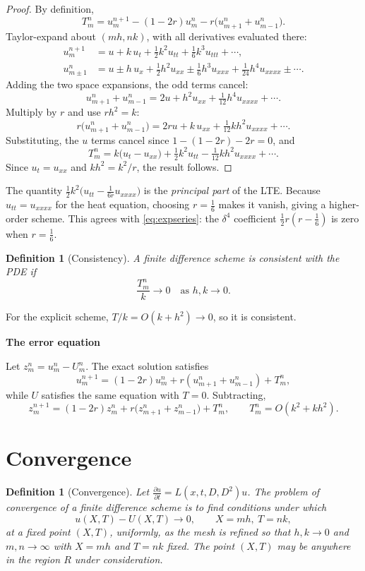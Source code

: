 \documentclass[11pt,a4paper]{article}
\numberwithin{equation}{section}
\theoremstyle{spacedplain}
\theoremstyle{spaceddefinition}
\newtheorem{definition}[theorem]{Definition}
\theoremstyle{spacedremark}
\newcommand{\step}[1]{\par\addvspace{0.6em}\noindent\textbf{#1}\par\nobreak}
\newcommand{\pd}[2]{\frac{\partial #1}{\partial #2}}
\begin{document}
\begin{proof}
By definition,
\[
  T_m^n=u_m^{n+1}-(1-2r)u_m^n-r\bigl(u_{m+1}^n+u_{m-1}^n\bigr).
\]
Taylor-expand about \((mh,nk)\), with all derivatives evaluated there:
\begin{align*}
  u_m^{n+1}&=u+k\,u_t+\tfrac12k^2u_{tt}+\tfrac16k^3u_{ttt}+\cdots,\\
  u_{m\pm1}^n&=u\pm h\,u_x+\tfrac12h^2u_{xx}\pm\tfrac16h^3u_{xxx}
    +\tfrac1{24}h^4u_{xxxx}\pm\cdots.
\end{align*}
Adding the two space expansions, the odd terms cancel:
\[
  u_{m+1}^n+u_{m-1}^n=2u+h^2u_{xx}+\tfrac1{12}h^4u_{xxxx}+\cdots.
\]
Multiply by \(r\) and use \(rh^2=k\):
\[
  r\bigl(u_{m+1}^n+u_{m-1}^n\bigr)
  =2ru+k\,u_{xx}+\tfrac{1}{12}kh^2u_{xxxx}+\cdots.
\]
Substituting, the \(u\) terms cancel since \(1-(1-2r)-2r=0\), and
\[
  T_m^n=k\bigl(u_t-u_{xx}\bigr)+\tfrac12k^2u_{tt}
        -\tfrac1{12}kh^2u_{xxxx}+\cdots.
\]
Since \(u_t=u_{xx}\) and \(kh^2=k^2/r\), the result follows.
\end{proof}

The quantity
\(\frac12k^2\bigl(u_{tt}-\frac1{6r}u_{xxxx}\bigr)\) is the
\emph{principal part} of the LTE.  Because \(u_{tt}=u_{xxxx}\) for the
heat equation, choosing \(r=\frac16\) makes it vanish, giving a
higher-order scheme.  This agrees with \eqref{eq:expseries}: the
\(\delta^4\) coefficient \(\frac12r(r-\frac16)\) is zero when
\(r=\frac16\).

\begin{definition}[Consistency]
A finite difference scheme is \emph{consistent} with the PDE if
\[
  \frac{T_m^n}{k}\to0\quad\text{as }h,k\to0.
\]
\end{definition}

For the explicit scheme, \(T/k=O(k+h^2)\to0\), so it is consistent.

\step{The error equation}
Let \(z_m^n=u_m^n-U_m^n\).  The exact
solution satisfies
\[
  u_m^{n+1}=(1-2r)u_m^n+r(u_{m+1}^n+u_{m-1}^n)+T_m^n,
\]
while \(U\) satisfies the same equation with \(T=0\).  Subtracting,
\begin{equation}\label{eq:erreq}
  z_m^{n+1}=(1-2r)z_m^n+r\bigl(z_{m+1}^n+z_{m-1}^n\bigr)+T_m^n,
  \qquad T_m^n=O(k^2+kh^2).
\end{equation}

\section{Convergence}

\begin{definition}[Convergence]
Let \(\pd ut=L(x,t,D,D^2)u\).  The problem of convergence of a finite
difference scheme is to find conditions under which
\[
  u(X,T)-U(X,T)\to0,\qquad X=mh,\ T=nk,
\]
at a \emph{fixed} point \((X,T)\), uniformly, as the mesh is refined so
that \(h,k\to0\) and \(m,n\to\infty\) with \(X=mh\) and \(T=nk\) fixed.
The point \((X,T)\) may be anywhere in the region \(R\) under
consideration.
\end{definition}
\end{document}
